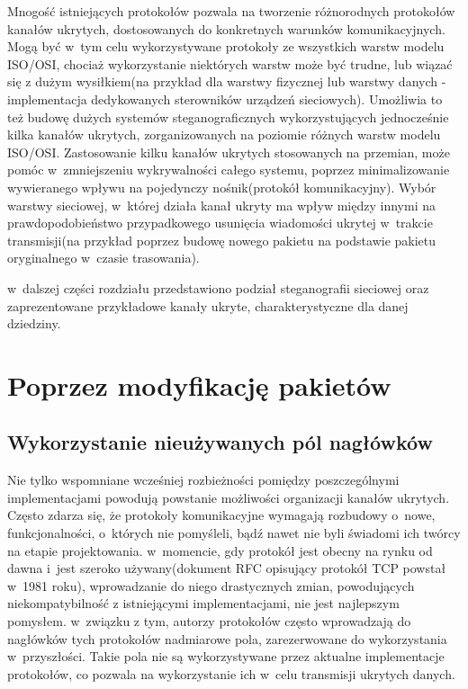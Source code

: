 \documentclass[a4paper, twoside, 12pt]{report}
\begin{document}
    Mnogość istniejących protokołów pozwala na tworzenie różnorodnych protokołów
    kanałów ukrytych, dostosowanych do konkretnych warunków komunikacyjnych.
    Mogą być w~tym celu wykorzystywane protokoły ze wszystkich warstw modelu
    ISO/OSI, chociaż wykorzystanie niektórych warstw może być trudne, lub wiązać
    się z dużym wysiłkiem(na przykład dla warstwy fizycznej lub warstwy danych -
    implementacja dedykowanych sterowników urządzeń sieciowych). Umożliwia to
    też budowę dużych systemów steganograficznych wykorzystujących jednocześnie
    kilka kanałów ukrytych, zorganizowanych na poziomie różnych warstw modelu ISO/OSI.
    Zastosowanie kilku kanałów ukrytych stosowanych na przemian, może pomóc w~zmniejszeniu
    wykrywalności całego systemu, poprzez minimalizowanie wywieranego wpływu na pojedynczy
    nośnik(protokół komunikacyjny). Wybór warstwy sieciowej, w~której działa kanał ukryty
    ma wpływ między innymi na prawdopodobieństwo przypadkowego usunięcia wiadomości
    ukrytej w~trakcie transmisji(na przykład poprzez budowę nowego pakietu na podstawie
    pakietu oryginalnego w~czasie trasowania).

    w~dalszej części rozdziału przedstawiono podział steganografii sieciowej
    oraz zaprezentowane przykładowe kanały ukryte, charakterystyczne dla danej
    dziedziny.
    \section{Poprzez modyfikację pakietów} \label{MODYFIKACJAPAKIETOW}
        \subsection{Wykorzystanie nieużywanych pól nagłówków}
        Nie tylko wspomniane wcześniej rozbieżności pomiędzy poszczególnymi
        implementacjami powodują powstanie możliwości organizacji kanałów ukrytych.
        Często zdarza się, że protokoły komunikacyjne wymagają rozbudowy o~nowe,
        funkcjonalności, o~których nie pomyśleli, bądź nawet nie byli świadomi
        ich twórcy na etapie projektowania. w~momencie, gdy protokół jest obecny
        na rynku od dawna i~jest szeroko używany(dokument RFC opisujący protokół TCP
        powstał w~1981 roku\cite{TCPRFC}), wprowadzanie do niego drastycznych zmian,
        powodujących niekompatybilność z istniejącymi implementacjami, nie jest
        najlepszym pomysłem. w~związku z tym, autorzy protokołów często wprowadzają
        do nagłówków tych protokołów nadmiarowe pola, zarezerwowane do wykorzystania
        w~przyszłości. Takie pola nie są wykorzystywane przez aktualne implementacje
        protokołów, co pozwala na wykorzystanie ich w~celu transmisji ukrytych danych.
\end{document}
